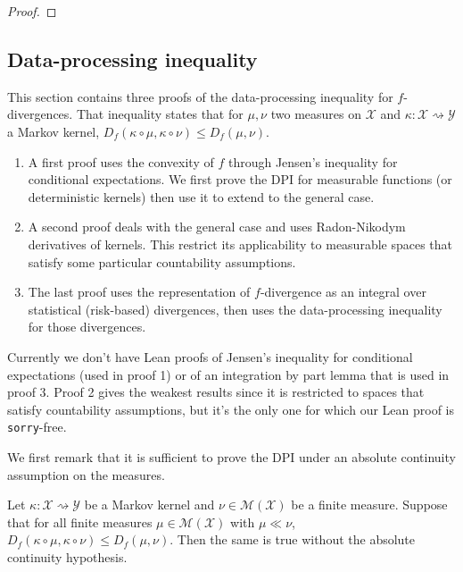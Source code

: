 \begin{proof}%
{}

\end{proof}




\subsection{Data-processing inequality}

This section contains three proofs of the data-processing inequality for $f$-divergences.
That inequality states that for $\mu, \nu$ two measures on $\mathcal X$ and $\kappa : \mathcal X \rightsquigarrow \mathcal Y$ a Markov kernel, $D_f(\kappa \circ \mu, \kappa \circ \nu) \le D_f(\mu, \nu)$.
\begin{enumerate}
  \item A first proof uses the convexity of $f$ through Jensen's inequality for conditional expectations. We first prove the DPI for measurable functions (or deterministic kernels) then use it to extend to the general case.
  \item A second proof deals with the general case and uses Radon-Nikodym derivatives of kernels. This restrict its applicability to measurable spaces that satisfy some particular countability assumptions.
  \item The last proof uses the representation of $f$-divergence as an integral over statistical (risk-based) divergences, then uses the data-processing inequality for those divergences.
\end{enumerate}

\begin{leanremark}
Currently we don't have Lean proofs of Jensen's inequality for conditional expectations (used in proof 1) or of an integration by part lemma that is used in proof 3.
Proof 2 gives the weakest results since it is restricted to spaces that satisfy countability assumptions, but it's the only one for which our Lean proof is \texttt{sorry}-free.
\end{leanremark}

We first remark that it is sufficient to prove the DPI under an absolute continuity assumption on the measures. 

\begin{lemma}
  \label{lem:DPI_of_DPI_ac}
  \leanok
  Let $\kappa : \mathcal X \rightsquigarrow \mathcal Y$ be a Markov kernel and $\nu \in \mathcal M(\mathcal X)$ be a finite measure.
  Suppose that for all finite measures $\mu \in \mathcal M(\mathcal X)$ with $\mu \ll \nu$, $D_f(\kappa \circ \mu, \kappa \circ \nu) \le D_f(\mu, \nu)$.
  Then the same is true without the absolute continuity hypothesis.
\end{lemma}

